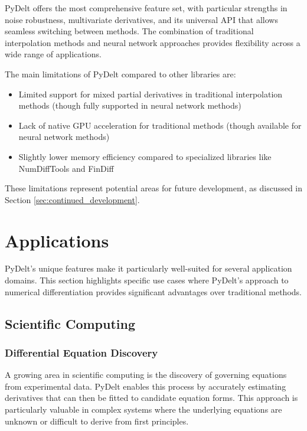 \documentclass[11pt,a4paper]{article}
\begin{document}
PyDelt offers the most comprehensive feature set, with particular strengths in noise robustness, multivariate derivatives, and its universal API that allows seamless switching between methods. The combination of traditional interpolation methods and neural network approaches provides flexibility across a wide range of applications.

The main limitations of PyDelt compared to other libraries are:
\begin{itemize}
    \item Limited support for mixed partial derivatives in traditional interpolation methods (though fully supported in neural network methods)
    \item Lack of native GPU acceleration for traditional methods (though available for neural network methods)
    \item Slightly lower memory efficiency compared to specialized libraries like NumDiffTools and FinDiff
\end{itemize}

These limitations represent potential areas for future development, as discussed in Section \ref{sec:continued_development}.

\section{Applications}

PyDelt's unique features make it particularly well-suited for several application domains. This section highlights specific use cases where PyDelt's approach to numerical differentiation provides significant advantages over traditional methods.

\subsection{Scientific Computing}

\subsubsection{Differential Equation Discovery}

A growing area in scientific computing is the discovery of governing equations from experimental data. PyDelt enables this process by accurately estimating derivatives that can then be fitted to candidate equation forms. This approach is particularly valuable in complex systems where the underlying equations are unknown or difficult to derive from first principles.
\end{document}
